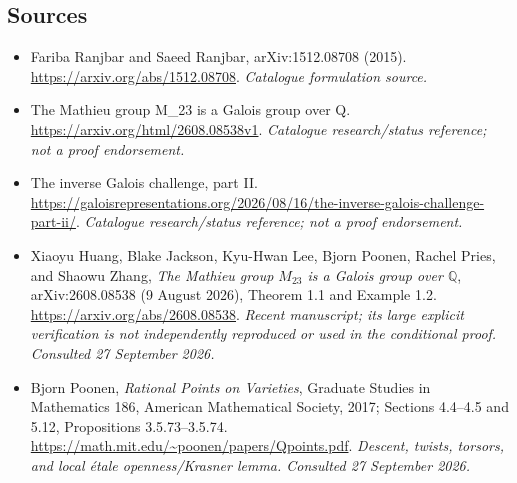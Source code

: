 \documentclass[11pt,a4paper]{article}
\newcommand{\Q}{\mathbb{Q}}
\numberwithin{equation}{section}
\begin{document}
\subsection{Sources}
\begin{itemize}\raggedright
\item[\textnormal{[S1]}]\hypertarget{source:20:1}{} Fariba Ranjbar and Saeed Ranjbar, arXiv:1512.08708 (2015).
\url{https://arxiv.org/abs/1512.08708}.
{\small\textit{Catalogue formulation source.}}
\item[\textnormal{[S2]}]\hypertarget{source:20:2}{} The Mathieu group M\_23 is a Galois group over Q.
\url{https://arxiv.org/html/2608.08538v1}.
{\small\textit{Catalogue research/status reference; not a proof endorsement.}}
\item[\textnormal{[S3]}]\hypertarget{source:20:3}{} The inverse Galois challenge, part II.
\url{https://galoisrepresentations.org/2026/08/16/the-inverse-galois-challenge-part-ii/}.
{\small\textit{Catalogue research/status reference; not a proof endorsement.}}

\item[\textnormal{[E1]}]\hypertarget{extra:20:1}{} Xiaoyu Huang, Blake Jackson, Kyu-Hwan Lee, Bjorn Poonen, Rachel Pries, and Shaowu Zhang, \emph{The Mathieu group $M_{23}$ is a Galois group over $\Q$}, arXiv:2608.08538 (9 August 2026), Theorem 1.1 and Example 1.2.
\url{https://arxiv.org/abs/2608.08538}.
{\small\textit{Recent manuscript; its large explicit verification is not independently reproduced or used in the conditional proof. Consulted 27 September 2026.}}
\item[\textnormal{[E2]}]\hypertarget{extra:20:2}{} Bjorn Poonen, \emph{Rational Points on Varieties}, Graduate Studies in Mathematics 186, American Mathematical Society, 2017; Sections 4.4--4.5 and 5.12, Propositions 3.5.73--3.5.74.
\url{https://math.mit.edu/~poonen/papers/Qpoints.pdf}.
{\small\textit{Descent, twists, torsors, and local étale openness/Krasner lemma. Consulted 27 September 2026.}}
\end{itemize}
\end{document}
